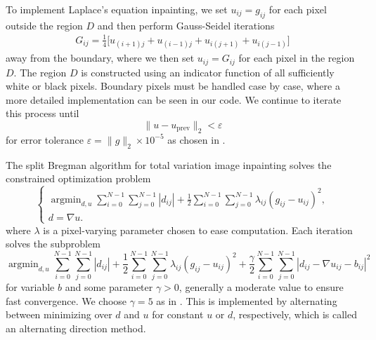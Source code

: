 \documentclass[11pt,reqno,twoside]{amsart}
\theoremstyle{plain}
\theoremstyle{definition}
\newcommand{\argmin}{\operatorname{argmin}}
\numberwithin{figure}{section}
\numberwithin{equation}{section}
\begin{document}
To implement Laplace's equation inpainting, we set $u_{ij} = g_{ij}$ for each pixel outside the region $D$ and then perform Gauss-Seidel iterations
\begin{align*}
G_{ij} = \frac{1}{4}\Big[u_{(i+1)j} + u_{(i-1)j} + u_{i(j+1)} + u_{i(j-1)}\Big]
\end{align*}
away from the boundary, where we then set $u_{ij} = G_{ij}$ for each pixel in the region $D$.  The region $D$ is constructed using an indicator function of all sufficiently white or black pixels.  Boundary pixels must be handled case by case, where a more detailed implementation can be seen in our code.  We continue to iterate this process until 
\begin{equation*}
\|u - u_{\text{prev}}\|_2 < \varepsilon
\end{equation*}
for error tolerance $\varepsilon = \|g\|_2 \times 10^{-5}$ as chosen in \cite{ge2012}.

The split Bregman algorithm for total variation image inpainting solves the constrained optimization problem
\begin{equation*}
\begin{cases}
\argmin_{d,u} \sum_{i=0}^{N-1} \sum_{j=0}^{N-1} |d_{ij}| + \frac{1}{2}\sum_{i=0}^{N-1} \sum_{j=0}^{N-1} \lambda_{ij} (g_{ij} - u_{ij})^2, \\
d = \nabla u.
\end{cases}
\end{equation*}
where $\lambda$ is a pixel-varying parameter chosen to ease computation.  Each iteration solves the subproblem
\begin{equation*}
\argmin_{d,u} \sum_{i=0}^{N-1} \sum_{j=0}^{N-1} |d_{ij}| + \frac{1}{2}\sum_{i=0}^{N-1} \sum_{j=0}^{N-1} \lambda_{ij} (g_{ij} - u_{ij})^2 + \frac{\gamma}{2}\sum_{i=0}^{N-1} \sum_{j=0}^{N-1} |d_{ij}-\nabla u_{ij} - b_{ij}|^2
\end{equation*}
for variable $b$ and some parameter $\gamma > 0$, generally a moderate value to ensure fast convergence.  We choose $\gamma = 5$ as in \cite{ge2012}.  This is implemented by alternating between minimizing over $d$ and $u$ for constant $u$ or $d$, respectively, which is called an alternating direction method.  
\end{document}
